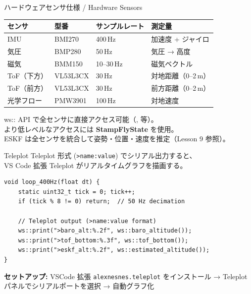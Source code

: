 
\begin{frame}{ハードウェアセンサ仕様 / Hardware Sensors}
  \centering

  {\small
  \begin{tabular}{llll}
    \hline
    \textbf{センサ} & \textbf{型番} & \textbf{サンプルレート} & \textbf{測定量} \\
    \hline
    IMU        & BMI270  & 400\,Hz  & 加速度 + ジャイロ \\
    気圧       & BMP280  & 50\,Hz   & 気圧 → 高度 \\
    磁気       & BMM150  & 10--30\,Hz & 磁気ベクトル \\
    ToF（下方） & VL53L3CX & 30\,Hz  & 対地距離（0--2\,m） \\
    ToF（前方） & VL53L3CX & 30\,Hz  & 前方距離（0--2\,m） \\
    光学フロー  & PMW3901 & 100\,Hz  & 対地速度 \\
    \hline
  \end{tabular}
  }

  \vspace{1em}

  {\footnotesize
    ws:: API で全センサに直接アクセス可能（,  等）。\\
    より低レベルなアクセスには \textbf{StampFlyState} を使用。\\
    ESKF は全センサを統合して姿勢・位置・速度を推定（Lesson 9 参照）。
  }
\end{frame}

\begin{frame}[fragile]{Teleplot}
  {\small Teleplot 形式 (\texttt{>name:value}) でシリアル出力すると、\\
  VS Code 拡張 Teleplot がリアルタイムグラフを描画する。}

  \vspace{0.3em}

  \begin{lstlisting}[style=sfcpp, basicstyle=\ttfamily\scriptsize]
void loop_400Hz(float dt) {
    static uint32_t tick = 0; tick++;
    if (tick % 8 != 0) return;  // 50 Hz decimation

    // Teleplot output (>name:value format)
    ws::print(">baro_alt:%.2f", ws::baro_altitude());
    ws::print(">tof_bottom:%.3f", ws::tof_bottom());
    ws::print(">eskf_alt:%.2f", ws::estimated_altitude());
}
  \end{lstlisting}

  \vspace{0.2em}
  {\footnotesize
    \textbf{セットアップ:} VSCode 拡張 \texttt{alexnesnes.teleplot} をインストール
    → Teleplot パネルでシリアルポートを選択 → 自動グラフ化
  }
\end{frame}

